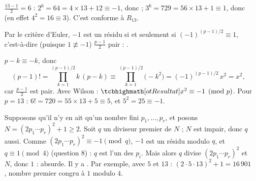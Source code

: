 \begin{corrigeEval}[Applications]{}{}
\begin{questions}[start=7]
  \item $\frac{13-1}{2}=6$ : $2^{6}=64=4\times13+12\equiv-1$, donc
     ; $3^{6}=729=56\times13+1\equiv1$, donc
     (en effet $4^{2}=16\equiv3$). C'est conforme
    à $R_{13}$.
  \item Par le critère d'Euler, $-1$ est un résidu si et seulement si
    $(-1)^{(p-1)/2}\equiv1$, c'est-à-dire (puisque $1\not\equiv-1$)
    $\frac{p-1}{2}$ pair : .
  \item $p-k\equiv-k$, donc
    \[(p-1)!=\prod_{k=1}^{(p-1)/2}k\,(p-k)\equiv\prod_{k=1}^{(p-1)/2}\bigl(-k^{2}\bigr)
      =(-1)^{(p-1)/2}\,x^{2}=x^{2},\]
    car $\frac{p-1}{2}$ est pair. Avec Wilson : $\res{x^{2}\equiv-1\pmod p}$.
    Pour $p=13$ : $6!=720=55\times13+5\equiv5$, et $5^{2}=25\equiv-1$.
  \item Supposons qu'il n'y en ait qu'un nombre fini $p_1,\dots,p_r$, et
    posons $N=(2p_1\cdots p_r)^{2}+1\geqslant2$. Soit $q$ un diviseur premier
    de $N$ ; $N$ est impair, donc $q$ aussi. Comme
    $(2p_1\cdots p_r)^{2}\equiv-1\pmod q$, $-1$ est un résidu modulo $q$, et
    $q\equiv1\pmod4$ (question 8) : $q$ est l'un des $p_i$. Mais alors $q$
    divise $(2p_1\cdots p_r)^{2}$ et $N$, donc $1$ : absurde. Il y a
    . Par exemple, avec
    $5$ et $13$ : $(2\cdot5\cdot13)^{2}+1=16\,901$, nombre premier congru à
    $1$ modulo $4$.
\end{questions}
\end{corrigeEval}
